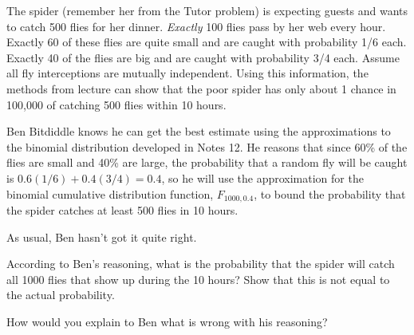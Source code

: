 \documentclass[11pt]{article}
\begin{document}

%

\begin{problem}
The spider (remember her from the Tutor problem) is expecting guests
and wants to catch 500 flies for her dinner.  \emph{Exactly} 100 flies
pass by her web every hour.  Exactly 60 of these flies are quite small
and are caught with probability 1/6 each.  Exactly 40 of the flies are
big and are caught with probability 3/4 each.  Assume all fly
interceptions are mutually independent.  Using this information, the
methods from lecture can show that the poor spider has only about 1
chance in 100,000 of catching 500 flies within 10 hours.

Ben Bitdiddle knows he can get the best estimate using the approximations
to the binomial distribution developed in Notes 12.  He reasons that since
60\% of the flies are small and 40\% are large, the probability that a
random fly will be caught is $0.6(1/6)+0.4(3/4) = 0.4$, so he will use the
approximation for the binomial cumulative distribution function,
$F_{1000,0.4}$, to bound the probability that the spider catches at least
500 flies in 10 hours.

As usual, Ben hasn't got it quite right.

\begin{problemparts}

\problempart According to Ben's reasoning, what is the probability that the
spider will catch all 1000 flies that show up during the 10 hours?  Show
that this is not equal to the actual probability.


\problempart How would you explain to Ben what is wrong with his reasoning?



\end{problemparts}
\end{problem}
\end{document}
